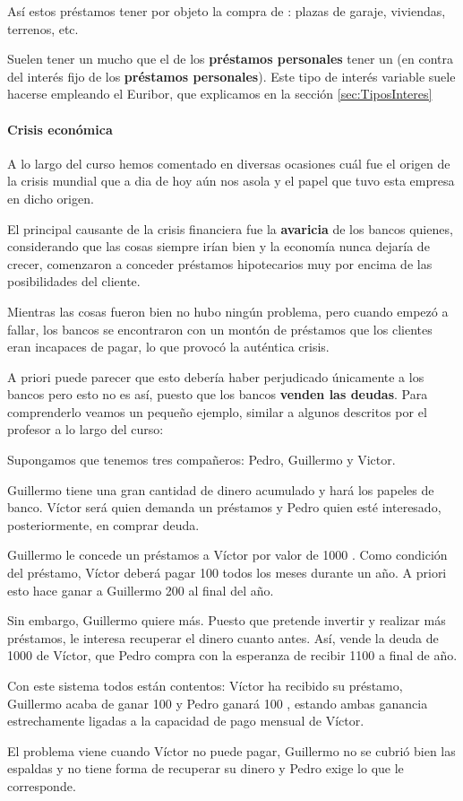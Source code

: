 \documentclass[nochap,palatino,shortheader]{apuntes}
\begin{document}
Así estos préstamos  tener por objeto la compra de : plazas de garaje, viviendas, terrenos, etc.

Suelen tener un  mucho  que el de los \textbf{préstamos personales}  tener un  (en contra del interés fijo de los \textbf{préstamos personales}). Este tipo de interés variable suele hacerse empleando el Euribor, que explicamos en la sección \ref{sec:TiposInteres}

\paragraph{Crisis económica}
A lo largo del curso hemos comentado en diversas ocasiones cuál fue el origen de la crisis mundial que a dia de hoy aún nos asola y el papel que tuvo esta empresa en dicho origen.

El principal causante de la crisis financiera fue la \textbf{avaricia} de los bancos quienes, considerando que las cosas siempre irían bien y la economía nunca dejaría de crecer, comenzaron a conceder préstamos hipotecarios muy por encima de las posibilidades del cliente.

Mientras las cosas fueron bien no hubo ningún problema, pero cuando empezó a fallar, los bancos se encontraron con un montón de préstamos que los clientes eran incapaces de pagar, lo que provocó la auténtica crisis.

A priori puede parecer que esto debería haber perjudicado únicamente a los bancos pero esto no es así, puesto que los bancos \textbf{venden las deudas}. Para comprenderlo veamos un pequeño ejemplo, similar a algunos descritos por el profesor a lo largo del curso:

\begin{example}
Supongamos que tenemos tres compañeros: Pedro, Guillermo y Victor.

Guillermo tiene una gran cantidad de dinero acumulado y hará los papeles de banco. Víctor será quien demanda un préstamos y Pedro quien esté interesado, posteriormente, en comprar deuda.

Guillermo le concede un préstamos a Víctor por valor de 1000 \texteuro. Como condición del préstamo, Víctor deberá pagar 100 \texteuro todos los meses durante un año. A priori esto hace ganar a Guillermo 200 \texteuro al final del año.

Sin embargo, Guillermo quiere más. Puesto que pretende invertir y realizar más préstamos, le interesa recuperar el dinero cuanto antes. Así, vende la deuda de 1000 \texteuro de Víctor, que Pedro compra con la esperanza de recibir 1100 \texteuro a final de año.

Con este sistema todos están contentos: Víctor ha recibido su préstamo, Guillermo acaba de ganar 100 \texteuro y Pedro ganará 100 \texteuro, estando ambas ganancia estrechamente ligadas a la capacidad de pago mensual de Víctor.

El problema viene cuando Víctor no puede pagar, Guillermo no se cubrió bien las espaldas y no tiene forma de recuperar su dinero y Pedro exige lo que le corresponde.
\end{example}
\end{document}

